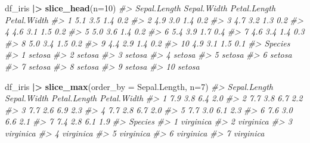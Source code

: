\documentclass[
  xelatex, ja=standard]{bxjsbook}
\newenvironment{Shaded}{\begin{snugshade}}{\end{snugshade}}
\newcommand{\AttributeTok}[1]{\textcolor[rgb]{0.13,0.29,0.53}{#1}}
\newcommand{\CommentTok}[1]{\textcolor[rgb]{0.56,0.35,0.01}{\textit{#1}}}
\newcommand{\DecValTok}[1]{\textcolor[rgb]{0.00,0.00,0.81}{#1}}
\newcommand{\FunctionTok}[1]{\textcolor[rgb]{0.13,0.29,0.53}{\textbf{#1}}}
\newcommand{\NormalTok}[1]{#1}
\newcommand{\SpecialCharTok}[1]{\textcolor[rgb]{0.81,0.36,0.00}{\textbf{#1}}}
\theoremstyle{definition}
\theoremstyle{definition}
\theoremstyle{definition}
\theoremstyle{definition}
\theoremstyle{remark}
\begin{document}
\begin{Shaded}
\begin{Highlighting}[]
\NormalTok{df\_iris }\SpecialCharTok{|\textgreater{}} \FunctionTok{slice\_head}\NormalTok{(}\AttributeTok{n=}\DecValTok{10}\NormalTok{)}
\CommentTok{\#\textgreater{}    Sepal.Length Sepal.Width Petal.Length Petal.Width}
\CommentTok{\#\textgreater{} 1           5.1         3.5          1.4         0.2}
\CommentTok{\#\textgreater{} 2           4.9         3.0          1.4         0.2}
\CommentTok{\#\textgreater{} 3           4.7         3.2          1.3         0.2}
\CommentTok{\#\textgreater{} 4           4.6         3.1          1.5         0.2}
\CommentTok{\#\textgreater{} 5           5.0         3.6          1.4         0.2}
\CommentTok{\#\textgreater{} 6           5.4         3.9          1.7         0.4}
\CommentTok{\#\textgreater{} 7           4.6         3.4          1.4         0.3}
\CommentTok{\#\textgreater{} 8           5.0         3.4          1.5         0.2}
\CommentTok{\#\textgreater{} 9           4.4         2.9          1.4         0.2}
\CommentTok{\#\textgreater{} 10          4.9         3.1          1.5         0.1}
\CommentTok{\#\textgreater{}    Species}
\CommentTok{\#\textgreater{} 1   setosa}
\CommentTok{\#\textgreater{} 2   setosa}
\CommentTok{\#\textgreater{} 3   setosa}
\CommentTok{\#\textgreater{} 4   setosa}
\CommentTok{\#\textgreater{} 5   setosa}
\CommentTok{\#\textgreater{} 6   setosa}
\CommentTok{\#\textgreater{} 7   setosa}
\CommentTok{\#\textgreater{} 8   setosa}
\CommentTok{\#\textgreater{} 9   setosa}
\CommentTok{\#\textgreater{} 10  setosa}
\end{Highlighting}
\end{Shaded}

\begin{Shaded}
\begin{Highlighting}[]
\NormalTok{df\_iris }\SpecialCharTok{|\textgreater{}} \FunctionTok{slice\_max}\NormalTok{(}\AttributeTok{order\_by =}\NormalTok{ Sepal.Length, }\AttributeTok{n=}\DecValTok{7}\NormalTok{)}
\CommentTok{\#\textgreater{}   Sepal.Length Sepal.Width Petal.Length Petal.Width}
\CommentTok{\#\textgreater{} 1          7.9         3.8          6.4         2.0}
\CommentTok{\#\textgreater{} 2          7.7         3.8          6.7         2.2}
\CommentTok{\#\textgreater{} 3          7.7         2.6          6.9         2.3}
\CommentTok{\#\textgreater{} 4          7.7         2.8          6.7         2.0}
\CommentTok{\#\textgreater{} 5          7.7         3.0          6.1         2.3}
\CommentTok{\#\textgreater{} 6          7.6         3.0          6.6         2.1}
\CommentTok{\#\textgreater{} 7          7.4         2.8          6.1         1.9}
\CommentTok{\#\textgreater{}     Species}
\CommentTok{\#\textgreater{} 1 virginica}
\CommentTok{\#\textgreater{} 2 virginica}
\CommentTok{\#\textgreater{} 3 virginica}
\CommentTok{\#\textgreater{} 4 virginica}
\CommentTok{\#\textgreater{} 5 virginica}
\CommentTok{\#\textgreater{} 6 virginica}
\CommentTok{\#\textgreater{} 7 virginica}
\end{Highlighting}
\end{Shaded}
\end{document}
